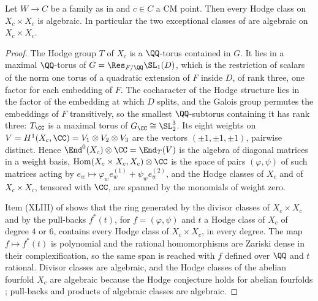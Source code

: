 \begin{theorem}\label{thm:mumfordcm}
Let $W\to C$ be a family as in  and $c\in C$ a CM
point. Then every Hodge class on $X_{c}\times X_{c}$ is algebraic. In
particular the two exceptional classes of  are
algebraic on $X_{c}\times X_{c}$.
\end{theorem}

\begin{proof}
The Hodge group $T$ of $X_{c}$ is a $\QQ$-torus contained in $G$. It lies in a
maximal $\QQ$-torus of $G=\Res_{F/\QQ}\SL_{1}(D)$, which is the restriction of
scalars of the norm one torus of a quadratic extension of $F$ inside $D$, of
rank three, one factor for each embedding of $F$. The cocharacter of the Hodge
structure lies in the factor of the embedding at which $D$ splits, and the
Galois group permutes the embeddings of $F$ transitively, so the smallest
$\QQ$-subtorus containing it has rank three: $T_{\CC}$ is a maximal torus of
$G_{\CC}\cong\SL_{2}^{3}$. Its eight weights on
$V=H^{1}(X_{c},\CC)=V_{1}\otimes V_{2}\otimes V_{3}$ are the vectors
$(\pm1,\pm1,\pm1)$, pairwise distinct. Hence
$\End^{0}(X_{c})\otimes\CC=\End_{T}(V)$ is the algebra of diagonal matrices
in a weight basis, $\operatorname{Hom}(X_{c}\times X_{c},X_{c})\otimes\CC$ is
the space of pairs $(\varphi,\psi)$ of such matrices acting by
$e_{w}\mapsto\varphi_{w}e_{w}^{(1)}+\psi_{w}e_{w}^{(2)}$, and the Hodge
classes of $X_{c}$ and of $X_{c}\times X_{c}$, tensored with $\CC$, are
spanned by the monomials of weight zero.

Item (XLIII) of  shows that the ring generated by the
divisor classes of $X_{c}\times X_{c}$ and by the pull-backs $f^{*}(t)$, for
$f=(\varphi,\psi)$ and $t$ a Hodge class of $X_{c}$ of degree $4$ or $6$,
contains every Hodge class of $X_{c}\times X_{c}$, in every degree. The map
$f\mapsto f^{*}(t)$ is polynomial and the rational homomorphisms are Zariski
dense in their complexification, so the same span is reached with $f$ defined
over $\QQ$ and $t$ rational. Divisor classes are algebraic, and the Hodge
classes of the abelian fourfold $X_{c}$ are algebraic because the Hodge
conjecture holds for abelian fourfolds \cite{Mar25a}; pull-backs and products
of algebraic classes are algebraic.
\end{proof}

